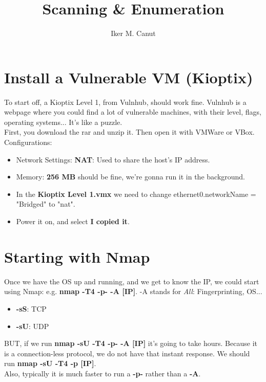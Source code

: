 \documentclass[11pt,a4paper]{article}
\author{Iker M. Canut}
\begin{document}
\title{Scanning \& Enumeration}
\maketitle
\newpage

\section{Install a Vulnerable VM (Kioptix)}
To start off, a Kioptix Level 1, from Vulnhub, should work fine. Vulnhub is a webpage where you could find a lot of vulnerable machines, with their level, flags, operating systems... It's like a puzzle. \\

First, you download the rar and unzip it. Then open it with VMWare or VBox. Configurations:
\begin{itemize}
\item Network Settings: \textbf{NAT}: Used to share the host's IP address.
\item Memory: \textbf{256 MB} should be fine, we're gonna run it in the background.
\item In the \textbf{Kioptix Level 1.vmx} we need to change ethernet0.networkName = "Bridged" to "nat".
\item Power it on, and select \textbf{I copied it}.
\end{itemize}

\section{Starting with Nmap}
Once we have the OS up and running, and we get to know the IP, we could start using Nmap: e.g. \textbf{nmap -T4 -p- -A [IP]}. -A stands for \textit{All}: Fingerprinting, OS...\\

\begin{multicols}{2}
\begin{itemize}
\item \textbf{-sS}: TCP
\item \textbf{-sU}: UDP
\end{itemize}
\end{multicols}

BUT, if we run \textbf{nmap -sU -T4 -p- -A [IP]} it's going to take hours. Because it is a connection-less protocol, we do not have that instant response. We should run \textbf{nmap -sU -T4 -p [IP]}.\\

Also, typically it is much faster to run a \textbf{-p-} rather than a \textbf{-A}.
\end{document}
